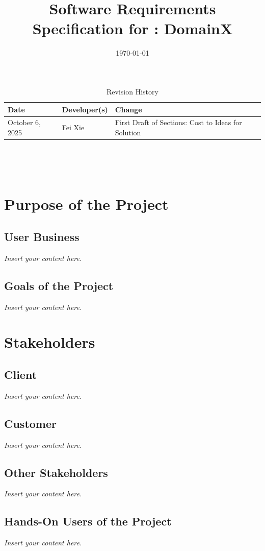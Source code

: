 \documentclass[12pt]{article}
\newcommand{\lips}{\textit{Insert your content here.}}
\begin{document}
\title{Software Requirements Specification for \progname: DomainX} 
\author{\authname}
\date{\today}
	
\maketitle

\begin{table}[hp]
\caption{Revision History} \label{TblRevisionHistory}
\begin{tabularx}{\textwidth}{llX}
\toprule
\textbf{Date} & \textbf{Developer(s)} & \textbf{Change}\\
\midrule
October 6, 2025 & Fei Xie & First Draft of Sections: Cost to Ideas for Solution\\
\bottomrule
\end{tabularx}
\end{table}

~\newpage

\tableofcontents

~\newpage
\section{Purpose of the Project}
\subsection{User Business}
\lips
\subsection{Goals of the Project}
\lips
\section{Stakeholders}
\subsection{Client}
\lips
\subsection{Customer}
\lips
\subsection{Other Stakeholders}
\lips
\subsection{Hands-On Users of the Project}
\lips
\end{document}
